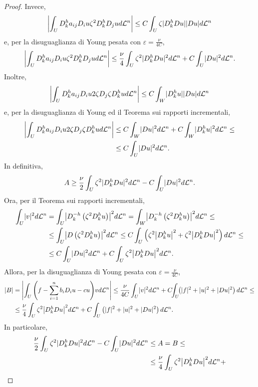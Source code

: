 \begin{proof}
	Invece,
	\[ \abs*{\int_U D^h_ka_{ij}D_iu\zeta^2D^h_kD_ju d\mathcal{L}^n} \le C \int_U \zeta \abs{D^h_kDu}\abs{Du}d\mathcal{L}^n\]
	e, per la disuguaglianza di Young pesata con $\varepsilon = \frac{\nu}{4C}$,
	\[ \abs*{\int_U D^h_ka_{ij}D_iu\zeta^2D^h_kD_ju d\mathcal{L}^n} \le \frac{\nu}{4} \int_U \zeta^2 \abs{D^h_kDu}^2 d\mathcal{L}^n + C\int_U \abs{Du}^2d\mathcal{L}^n.\]
	Inoltre,
	\[ \abs*{\int_U D^h_ka_{ij}D_iu2\zeta D_j \zeta D^h_ku d\mathcal{L}^n} \le C \int_W \abs{D^h_k u}\abs{Du}d\mathcal{L}^n\]
	e, per la disuguaglianza di Young ed il Teorema sui rapporti incrementali,
	\begin{align*}
		\abs*{\int_U D^h_ka_{ij}D_iu2\zeta D_j \zeta D^h_ku d\mathcal{L}^n} &\le  C\int_W \abs{Du}^2 d\mathcal{L}^n + C\int_{W}\abs{D^h_ku}^2d\mathcal{L}^n \le \\
		&\le  C\int_U \abs{Du}^2 d\mathcal{L}^n.
	\end{align*}
	In definitiva,
	\[ A \ge  \frac{\nu}{2} \int_U \zeta^2 \abs{D^h_kDu}^2d\mathcal{L}^n - C \int_U \abs{Du}^2d\mathcal{L}^n. \]
	Ora, per il Teorema sui rapporti incrementali,
	\begin{align*}
		\int_U \abs{v}^2 d\mathcal{L}^n &= \int_U \abs*{D^{-h}_k\left( \zeta^2 D^h_k u\right)}^2d\mathcal{L}^n = \int_W \abs*{D^{-h}_k\left( \zeta^2 D^h_k u\right)}^2d\mathcal{L}^n \le \\
		&\le \int_U \abs*{D\left( \zeta^2 D^h_ku\right) }^2d\mathcal{L}^n \le C \int_U\left(  \zeta^2\abs*{D^h_k u}^2 + \zeta^2\abs*{D^h_kDu}^2\right) d\mathcal{L}^n \le \\
		&\le C \int_U \abs{Du}^2 d\mathcal{L}^n + C\int_U \zeta^2 \abs*{D^h_kDu}^2d\mathcal{L}^n.
	\end{align*}
	Allora, per la disuguaglianza di Young pesata con $\varepsilon = \frac{\nu}{4C}$,
	\begin{align*}
		\abs{B} &= \abs*{\int_U \left( f - \sum_{i=1}^{n}b_iD_iu - cu\right)\! vd\mathcal{L}^n} \le \frac{\nu}{4C} \int_U \abs{v}^2 d\mathcal{L}^n + C \!\! \int_U \!\! \left( \abs{f}^2 + \abs{u}^2 + \abs{Du}^2\right) d\mathcal{L}^n \le \\
		&\le \frac{\nu}{4} \int_U \zeta^2 \abs*{D^h_kDu}^2 d\mathcal{L}^n + C\int_U\left( \abs{f}^2 + \abs{u}^2 + \abs{Du}^2\right) d\mathcal{L}^n.
	\end{align*}
	In particolare,
	\begin{align*}
		\frac{\nu}{2} \int_U \zeta^2 \abs{D^h_kDu}^2d\mathcal{L}^n - C \int_U \abs{Du}^2d\mathcal{L}^n &\le A = B \le \\
		&\le  \frac{\nu}{4} \int_U \zeta^2 \abs*{D^h_kDu}^2 d\mathcal{L}^n + \\

\end{align*}
\end{proof}
